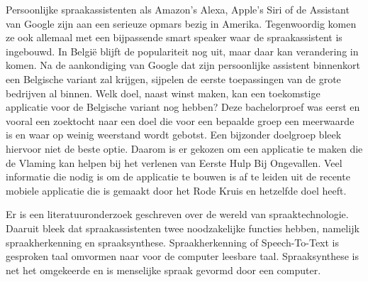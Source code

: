 
%
%

Persoonlijke spraakassistenten als Amazon's Alexa, Apple's Siri of de Assistant van Google zijn aan een serieuze opmars bezig in Amerika. Tegenwoordig komen ze ook allemaal met een bijpassende smart speaker waar de spraakassistent is ingebouwd. In België blijft de populariteit nog uit, maar daar kan verandering in komen. Na de aankondiging van Google dat zijn persoonlijke assistent binnenkort een Belgische variant zal krijgen, sijpelen de eerste toepassingen van de grote bedrijven al binnen. Welk doel, naast winst maken, kan een toekomstige applicatie voor de Belgische variant nog hebben? Deze bachelorproef was eerst en vooral een zoektocht naar een doel die voor een bepaalde groep een meerwaarde is en waar op weinig weerstand wordt gebotst. Een bijzonder doelgroep bleek hiervoor niet de beste optie. Daarom is er gekozen om een applicatie te maken die de Vlaming kan helpen bij het verlenen van Eerste Hulp Bij Ongevallen. Veel informatie die nodig is om de applicatie te bouwen is af te leiden uit de recente mobiele applicatie die is gemaakt door het Rode Kruis en hetzelfde doel heeft.

Er is een literatuuronderzoek geschreven over de wereld van spraaktechnologie. Daaruit bleek dat spraakassistenten twee noodzakelijke functies hebben, namelijk spraakherkenning en spraaksynthese. Spraakherkenning of Speech-To-Text is gesproken taal omvormen naar voor de computer leesbare taal. Spraaksynthese is net het omgekeerde en is menselijke spraak gevormd door een computer.

